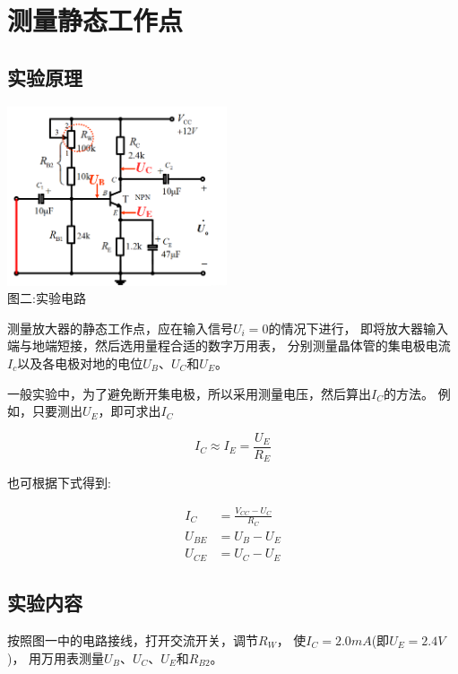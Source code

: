 \documentclass[a4paper]{article}
\begin{document}
    \vspace{1cm}


    \section{测量静态工作点}\label{sec:3}

    \subsection{实验原理}\label{subsec:2}
    \begin{center}
        \includegraphics[height=150pt]{exp2}\\
        {\small 图二:实验电路}
    \end{center}

    {{测量放大器的静态工作点，应在输入信号$U_i=0$的情况下进行，
    即将放大器输入端与地端短接，然后选用量程合适的数字万用表，
    分别测量晶体管的集电极电流$I_c$以及各电极对地的电位$U_B$、$U_C$和$U_E$。}}

    {{一般实验中，为了避免断开集电极，所以采用测量电压，然后算出$I_C$的方法。
    例如，只要测出$U_E$，即可求出$I_C$}}

    \begin{equation}
        I_C\approx I_E=\frac{U_E}{R_E}\label{eq:equation}
    \end{equation}

    {{也可根据下式得到:}}

    \begin{equation}
        \begin{aligned}
            I_C&=\frac{V_{CC}-U_C}{R_C}\\
            U_{BE}&=U_B-U_E\\
            U_{CE}&=U_C-U_E\label{eq:equation2}
        \end{aligned}
    \end{equation}

    \subsection{实验内容}\label{subsec:}
    {{按照图一中的电路接线，打开交流开关，调节$R_W$，
    使$I_C=2.0mA$(即$U_E=2.4V$)，
    用万用表测量$U_B$、$U_C$、$U_E$和$R_{B2}$。}}
\end{document}
